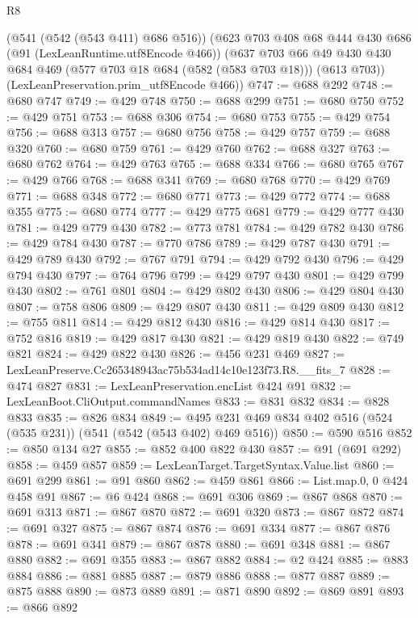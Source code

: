 \begin{lexlean}{R8}
\begin{coremodule}
    (@541 (@542 (@543 @411) @686 @516))
    (@623
      @703
      @408
      @68
      @444
      @430
      @686
      (@91 (LexLeanRuntime.utf8Encode @466))
      (@637
        @703
        @66
        @49
        @430
        @430
        @684
        @469
        (@577 @703 @18 @684 (@582 (@583 @703 @18)))
        (@613 @703))
      (LexLeanPreservation.prim_utf8Encode @466))
@747 := @688 @292
@748 := @680 @747
@749 := @429 @748
@750 := @688 @299
@751 := @680 @750
@752 := @429 @751
@753 := @688 @306
@754 := @680 @753
@755 := @429 @754
@756 := @688 @313
@757 := @680 @756
@758 := @429 @757
@759 := @688 @320
@760 := @680 @759
@761 := @429 @760
@762 := @688 @327
@763 := @680 @762
@764 := @429 @763
@765 := @688 @334
@766 := @680 @765
@767 := @429 @766
@768 := @688 @341
@769 := @680 @768
@770 := @429 @769
@771 := @688 @348
@772 := @680 @771
@773 := @429 @772
@774 := @688 @355
@775 := @680 @774
@777 := @429 @775 @681
@779 := @429 @777 @430
@781 := @429 @779 @430
@782 := @773 @781
@784 := @429 @782 @430
@786 := @429 @784 @430
@787 := @770 @786
@789 := @429 @787 @430
@791 := @429 @789 @430
@792 := @767 @791
@794 := @429 @792 @430
@796 := @429 @794 @430
@797 := @764 @796
@799 := @429 @797 @430
@801 := @429 @799 @430
@802 := @761 @801
@804 := @429 @802 @430
@806 := @429 @804 @430
@807 := @758 @806
@809 := @429 @807 @430
@811 := @429 @809 @430
@812 := @755 @811
@814 := @429 @812 @430
@816 := @429 @814 @430
@817 := @752 @816
@819 := @429 @817 @430
@821 := @429 @819 @430
@822 := @749 @821
@824 := @429 @822 @430
@826 := @456 @231 @469
@827 := LexLeanPreserve.Cc265348943ac75b534ad14c10e123f73.R8.__fits_7
@828 := @474 @827
@831 := LexLeanPreservation.encList @424 @91
@832 := LexLeanBoot.CliOutput.commandNames
@833 := @831 @832
@834 := @828 @833
@835 := @826 @834
@849 := @495 @231 @469 @834 @402 @516 (@524 (@535 @231)) (@541 (@542 (@543 @402) @469 @516))
@850 := @590 @516
@852 := @850 @134 @27
@855 := @852 @400 @822 @430
@857 := @91 (@691 @292)
@858 := @459 @857
@859 := LexLeanTarget.TargetSyntax.Value.list
@860 := @691 @299
@861 := @91 @860
@862 := @459 @861
@866 := List.map.{0, 0} @424 @458 @91
@867 := @6 @424
@868 := @691 @306
@869 := @867 @868
@870 := @691 @313
@871 := @867 @870
@872 := @691 @320
@873 := @867 @872
@874 := @691 @327
@875 := @867 @874
@876 := @691 @334
@877 := @867 @876
@878 := @691 @341
@879 := @867 @878
@880 := @691 @348
@881 := @867 @880
@882 := @691 @355
@883 := @867 @882
@884 := @2 @424
@885 := @883 @884
@886 := @881 @885
@887 := @879 @886
@888 := @877 @887
@889 := @875 @888
@890 := @873 @889
@891 := @871 @890
@892 := @869 @891
@893 := @866 @892

\end{coremodule}
\end{lexlean}
